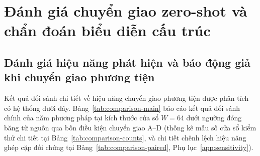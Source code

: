 \documentclass[12pt, a4paper, reqno, oneside]{book}
\begin{document}
\section{Đánh giá chuyển giao zero-shot và chẩn đoán biểu diễn cấu trúc}\label{sec:zeroshot-eval}
\subsection{Đánh giá hiệu năng phát hiện và báo động giả khi chuyển giao phương tiện}\label{sec:comparison-results}
Kết quả đối sánh chi tiết về hiệu năng chuyển giao phương tiện được phân tích có hệ thống dưới đây. Bảng~\ref{tab:comparison-main} báo cáo kết quả đối sánh chính của năm phương pháp tại kích thước cửa sổ $W=64$ dưới ngưỡng đóng băng từ nguồn qua bốn điều kiện chuyển giao A--D (thống kê mẫu số cửa sổ kiểm thử chi tiết tại Bảng~\ref{tab:comparison-counts}, và chi tiết chênh lệch hiệu năng ghép cặp đối chứng tại Bảng~\ref{tab:comparison-paired}, Phụ lục~\ref{app:sensitivity}).
\end{document}
